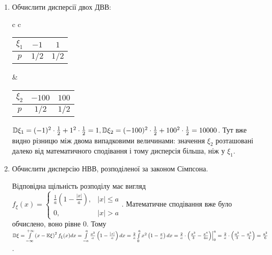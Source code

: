 \begin{example}
    \begin{enumerate}
        \item Обчислити дисперсії двох ДВВ:
        
        \begin{center}
            \begin{tabular}{c c}
                \begin{tabular}{|c|c|c|}
                    \hline
                    $\xi_1$ & $-1$ & $1$ \\ 
                    \hline
                    $p$ & $1/2$ & $1/2$ \\
                    \hline
                \end{tabular} &
                \begin{tabular}{|c|c|c|}
                    \hline
                    $\xi_2$ & $-100$ & $100$ \\ 
                    \hline
                    $p$ & $1/2$ & $1/2$ \\
                    \hline
                \end{tabular}
            \end{tabular}
        \end{center}
        
        $\mathbb{D}\xi_1 = (-1)^2\cdot \frac{1}{2} + 1^2\cdot \frac{1}{2} = 1, \mathbb{D}\xi_2 = (-100)^2\cdot \frac{1}{2} + 100^2\cdot \frac{1}{2} = 10000$.
        Тут вже видно різницю між двома випадковими величинами: значення $\xi_2$ розташовані далеко від математичного сподівання і тому дисперсія більша, ніж у $\xi_1$.
        \item Обчислити дисперсію НВВ, розподіленої за законом Сімпсона.
        
        Відповідна щільність розподілу має вигляд $f_\xi(x) = \begin{cases}
            \frac{1}{a} \left(1 - \frac{|x|}{a}\right), & |x| \leq a \\
            0, & |x| > a
        \end{cases}$.
        Математичне сподівання вже було обчислено, воно рівне 0. Тому $\mathbb{D}\xi = \int\limits_{-\infty}^{+\infty} \left(x-\mathbb{E}\xi\right)^2 f_\xi(x)dx =
        \int\limits_{-a}^a \frac{x^2}{a}\left(1 - \frac{|x|}{a}\right)dx = \frac{2}{a}\int\limits_0^a {x^2}\left(1 - \frac{x}{a}\right)dx =
        \frac{2}{a}\cdot \left( \frac{x^3}{3} - \frac{x^4}{4a}\right)\Bigr\vert_0^a = \frac{2}{a} \cdot \left( \frac{a^3}{3} - \frac{a^3}{4}\right) = \frac{a^2}{6}$.
    \end{enumerate}
\end{example}

